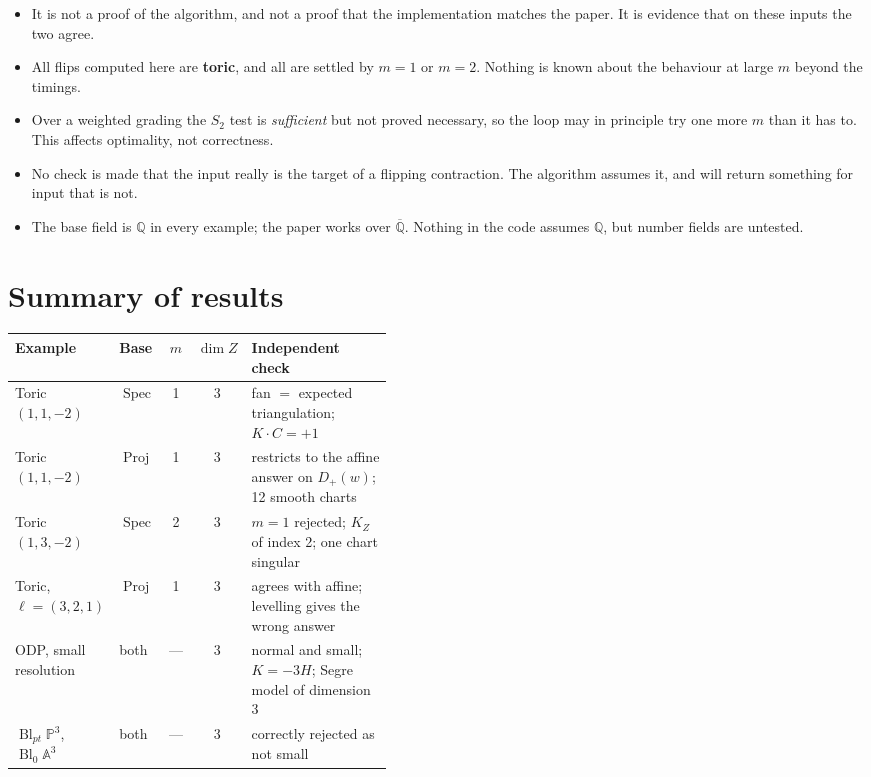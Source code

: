 \documentclass[11pt,reqno]{amsart}
\providecommand{\tightlist}{%
  \setlength{\itemsep}{0pt}\setlength{\parskip}{0pt}}
\newcommand{\PP}{\ensuremath{\mathbb{P}}}
\newcommand{\QQ}{\ensuremath{\mathbb{Q}}}
\newcommand{\bbA}{\ensuremath{\mathbb{A}}}
\DeclareMathOperator{\Proj}{Proj}
\DeclareMathOperator{\Spec}{Spec}
\DeclareMathOperator{\Bl}{Bl}
\theoremstyle{plain}
\theoremstyle{definition}
\begin{document}
\begin{itemize}
\tightlist
\item
  It is not a proof of the algorithm, and not a proof that the
  implementation matches the paper. It is evidence that on these inputs
  the two agree.
\item
  All flips computed here are \textbf{toric}, and all are settled by
  \(m = 1\) or \(m = 2\). Nothing is known about the behaviour at large
  \(m\) beyond the timings.
\item
  Over a weighted grading the \(S_2\) test is \emph{sufficient} but not
  proved necessary, so the loop may in principle try one more \(m\) than
  it has to. This affects optimality, not correctness.
\item
  No check is made that the input really is the target of a flipping
  contraction. The algorithm assumes it, and will return something for
  input that is not.
\item
  The base field is \QQ{} in every example; the paper works over
  \(\overline{\QQ{}}\). Nothing in the code assumes \QQ{}, but number fields are
  untested.
\end{itemize}

\section{Summary of results}\label{summary-of-results}

\begin{longtable}[]{@{}llccp{0.44\linewidth}@{}}
\toprule\noalign{}
Example & Base & \(m\) & \(\dim Z\) & Independent check \\
\midrule\noalign{}
\endhead
\bottomrule\noalign{}
\endlastfoot
Toric \((1,1,-2)\) & \(\Spec\) & 1 & 3 & fan \(=\) expected
triangulation; \(K \cdot C = +1\) \\
Toric \((1,1,-2)\) & \(\Proj\) & 1 & 3 & restricts to the affine
answer on \(D_+(w)\); 12 smooth charts \\
Toric \((1,3,-2)\) & \(\Spec\) & 2 & 3 & \(m=1\) rejected;
\(K_Z\) of index 2; one chart singular \\
Toric, \(\ell=(3,2,1)\) & \(\Proj\) & 1 & 3 & agrees with
affine; levelling gives the wrong answer \\
ODP, small resolution & both & --- & 3 & normal and small; \(K = -3H\);
Segre model of dimension 3 \\
\(\Bl_{pt} \PP^3\), \(\Bl_0 \bbA^3\) & both & --- & 3 &
correctly rejected as not small \\
\end{longtable}
\end{document}
